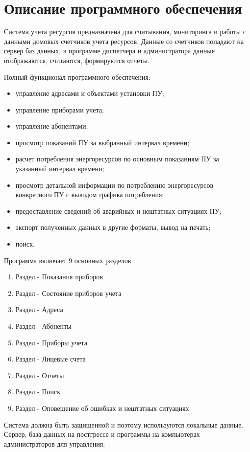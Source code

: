 
\section{Описание программного обеспечения}

Система учета ресурсов предназначена для считывания, мониторинга и работы с данными домовых счетчиков учета ресурсов. Данные со счетчиков попадают на сервер баз данных, в программе диспетчера и администратора данные отображаются, считаются, формируются отчеты.

Полный функционал программного обеспечения:
\begin{itemize}
\item управление адресами и объектами установки ПУ;
\item управление приборами учета;
\item управление абонентами; 
\item просмотр показаний ПУ за выбранный интервал времени; 
\item расчет потребления энергоресурсов по основным показаниям ПУ за указанный интервал времени; 
\item просмотр детальной информации по потреблению энергоресурсов конкретного ПУ с выводом графика потребления; 
\item предоставление сведений об аварийных и нештатных ситуациях ПУ; 
\item экспорт полученных данных в другие форматы, вывод на печать;
\item поиск.
\end{itemize}

Программа включает 9 основных разделов.
\begin{enumerate}
	\item Раздел - Показания приборов
	\item Раздел - Состояние приборов учета
	\item Раздел - Адреса
	\item Раздел - Абоненты
	\item Раздел - Приборы учета
	\item Раздел - Лицевые счета
	\item Раздел - Отчеты
	\item Раздел - Поиск
	\item Раздел - Оповещение об ошибках и нештатных ситуациях
\end{enumerate}

Система должна быть защищенной и поэтому используются локальные данные. Сервер, база данных на постгрессе и программы на компьютерах администраторов для управления. 

